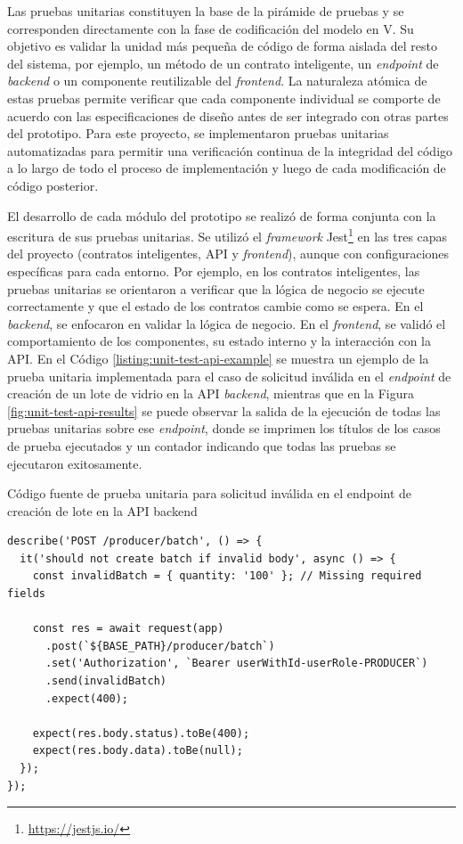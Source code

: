 Las pruebas unitarias constituyen la base de la pirámide de pruebas y se corresponden directamente con la fase de codificación del modelo en V. Su objetivo es validar la unidad más pequeña de código de forma aislada del resto del sistema, por ejemplo, un método de un contrato inteligente, un \textit{\gls{endpoint}} de \textit{backend} o un componente reutilizable del \textit{frontend}. La naturaleza atómica de estas pruebas permite verificar que cada componente individual se comporte de acuerdo con las especificaciones de diseño antes de ser integrado con otras partes del prototipo. Para este proyecto, se implementaron pruebas unitarias automatizadas para permitir una verificación continua de la integridad del código a lo largo de todo el proceso de implementación y luego de cada modificación de código posterior.

El desarrollo de cada módulo del prototipo se realizó de forma conjunta con la escritura de sus pruebas unitarias. Se utilizó el \textit{framework} Jest\footnote{\url{https://jestjs.io/}} en las tres capas del proyecto (contratos inteligentes, API y \textit{\gls{frontend}}), aunque con configuraciones específicas para cada entorno. Por ejemplo, en los contratos inteligentes, las pruebas unitarias se orientaron a verificar que la lógica de negocio se ejecute correctamente y que el estado de los contratos cambie como se espera. En el \textit{\gls{backend}}, se enfocaron en validar la lógica de negocio. En el \textit{frontend}, se validó el comportamiento de los componentes, su estado interno y la interacción con la API. En el Código \ref{listing:unit-test-api-example} se muestra un ejemplo de la prueba unitaria implementada para el caso de solicitud inválida en el \textit{\gls{endpoint}} de creación de un lote de vidrio en la API \textit{backend}, mientras que en la Figura \ref{fig:unit-test-api-results} se puede observar la salida de la ejecución de todas las pruebas unitarias sobre ese \textit{\gls{endpoint}}, donde se imprimen los títulos de los casos de prueba ejecutados y un contador indicando que todas las pruebas se ejecutaron exitosamente.


\begin{listing}[!tp]
\caption{Código fuente de prueba unitaria para solicitud inválida en el endpoint de creación de lote en la API backend}
\label{listing:unit-test-api-example}
\begin{verbatim}
describe('POST /producer/batch', () => {
  it('should not create batch if invalid body', async () => {
    const invalidBatch = { quantity: '100' }; // Missing required fields

    const res = await request(app)
      .post(`${BASE_PATH}/producer/batch`)
      .set('Authorization', `Bearer userWithId-userRole-PRODUCER`)
      .send(invalidBatch)
      .expect(400);

    expect(res.body.status).toBe(400);
    expect(res.body.data).toBe(null);
  });
});
\end{verbatim}
\end{listing}

